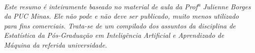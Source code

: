 \documentclass[
	12pt,
	a4paper,
	oneside,
	english,
	brazil,
]{abntex2}
\begin{document}
\frenchspacing 

\pretextual
\imprimircapa

\begin{epigrafe}
    \vspace*{\fill}
	\begin{flushright}
		\textit{Este resumo é inteiramente baseado no material de aula da Prof\textsuperscript{a} Julienne Borges da PUC Minas. Ele não pode e não deve ser publicado, muito menos utilizado para fins comerciais. Trata-se de um compilado dos assuntos da disciplina de Estatística da Pós-Graduação em Inteligência Artificial e Aprendizado de Máquina da referida universidade.}
	\end{flushright}
\end{epigrafe}

\tableofcontents*
\cleardoublepage

\textual






\begin{apendicesenv}


\end{apendicesenv}
\end{document}
